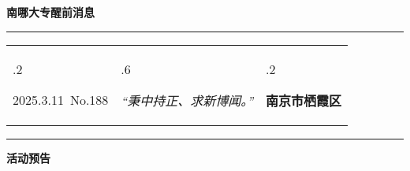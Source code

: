 \documentclass[letterpaper, 12pt]{article}
\begin{document}
\begin{center}
    \Huge\textbf{南哪大专醒前消息}
\end{center}
\vspace{4mm}
\hrule
\renewcommand\tabularxcolumn[1]{m{#1}}
\begin{tabularx}{\textwidth}{>{\hsize.2\hsize}X>{\hsize.6\hsize}X>{\hsize.2\hsize}X}
    \begin{flushleft}
        2025.3.11\, No.188
    \end{flushleft}
    &
    \begin{center}
        \textit{“秉中持正、求新博闻。”}
    \end{center}
    &
    \begin{flushright}
        \textbf{南京市栖霞区}
    \end{flushright}
\end{tabularx}
\vspace{-3.5mm}
\hrule
\vspace{4mm}
\centerline{\huge\textbf{活动预告}}
\end{document}
